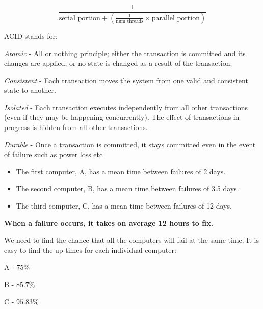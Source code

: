 \[
  \frac{1}{\text{serial portion} + (\frac{1}{\text{num threads}} \times \text{parallel portion})}
\]


ACID stands for:
\begin{description}
  \item \textit{Atomic} - All or nothing principle; either the transaction is
  committed and its changes are applied, or no state is changed as a result of
  the transaction.

  \item \textit{Consistent} - Each transaction moves the system from one valid
  and consistent state to another.

  \item \textit{Isolated} - Each transaction executes independently from all
  other transactions (even if they may be happening concurrently). The effect of
  transactions in progress is hidden from all other transactions.

  \item \textit{Durable} - Once a transaction is committed, it stays committed
  even in the event of failure such as power loss etc
\end{description}


\begin{itemize}
\item The first computer, A, has a mean time between failures of 2 days.
\item The second computer, B, has a mean time between failures of 3.5 days.
\item The third computer, C, has a mean time between failures of 12 days.
\end{itemize}

\textbf{When a failure occurs, it takes on average 12 hours to fix.}


We need to find the chance that all the computers will fail at the same time.
It is easy to find the up-times for each individual computer:

\begin{description}
  \item A - $75\%$
  \item B - $85.7\%$
  \item C - $95.83\%$
\end{description}


